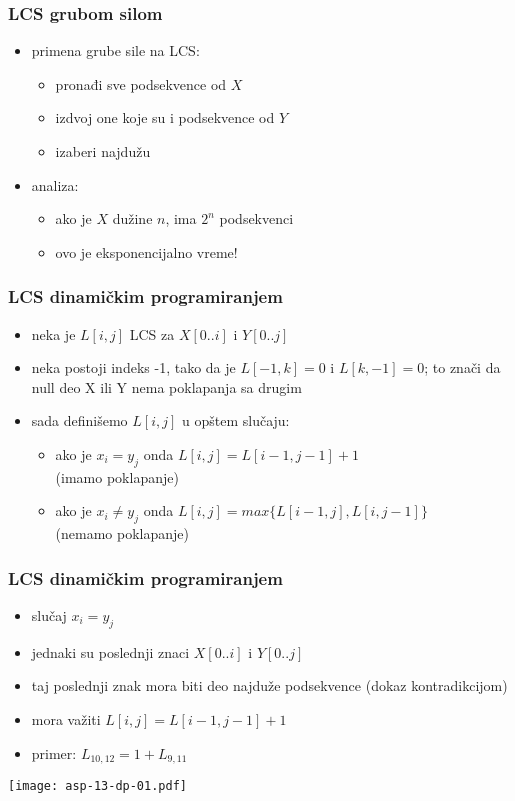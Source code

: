 \documentclass[compress,aspectratio=169]{beamer}
\begin{document}
\begin{frame}[fragile]
  \frametitle{LCS grubom silom}
  \begin{itemize}
    \item primena grube sile na LCS:
    \begin{itemize}
      \item pronađi sve podsekvence od $X$
      \item izdvoj one koje su i podsekvence od $Y$
      \item izaberi najdužu
    \end{itemize}
    \item analiza:
    \begin{itemize}
      \item ako je $X$ dužine $n$, ima $2^n$ podsekvenci
      \item ovo je eksponencijalno vreme!
    \end{itemize}
  \end{itemize}
\end{frame}

\begin{frame}[fragile]
  \frametitle{LCS dinamičkim programiranjem}
  \begin{itemize}
    \item neka je $L[i,j]$ LCS za $X[0..i]$ i $Y[0..j]$
    \item neka postoji indeks -1, tako da je $L[-1,k]=0$ i $L[k,-1]=0$; 
    to znači da null deo X ili Y nema poklapanja sa drugim
    \item sada definišemo $L[i,j]$ u opštem slučaju:
    \begin{itemize}
      \item ako je $x_{i}=y_{j}$ onda $L[i,j] = L[i-1,j-1]+1$ \\ (imamo poklapanje)
      \item ako je $x_{i}\neq y_{j}$ onda $L[i,j] = max\{L[i-1,j], L[i,j-1]\}$ \\ (nemamo poklapanje)
    \end{itemize}
  \end{itemize}
\end{frame}

\begin{frame}[fragile]
  \frametitle{LCS dinamičkim programiranjem}
  \begin{itemize}
    \item slučaj $x_{i}=y_{j}$
    \item jednaki su poslednji znaci $X[0..i]$ i $Y[0..j]$
    \item taj poslednji znak mora biti deo najduže podsekvence (dokaz kontradikcijom)
    \item mora važiti $L[i,j] = L[i-1,j-1]+1$
    \item primer: $L_{10,12} = 1 + L_{9,11}$
  \end{itemize}
  \begin{center}
    \texttt{[image: asp-13-dp-01.pdf]}
  \end{center}
\end{frame}
\end{document}
